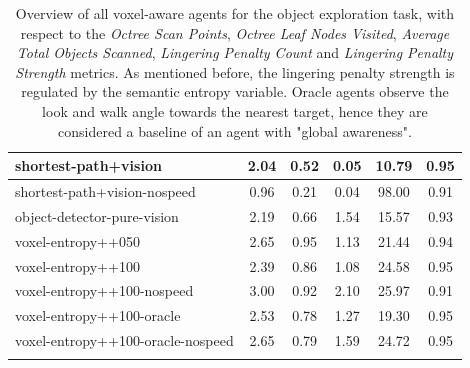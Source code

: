 \begin{table}
\begin{longtable}{|l|c|c|c|c|c|}
shortest-path+vision & {\cellcolor[HTML]{DCEBE8}} \color[HTML]{000000} 2.04 & {\cellcolor[HTML]{EBF2F0}} \color[HTML]{000000} 0.52 & {\cellcolor[HTML]{EBF2F0}} \color[HTML]{000000} 0.05 & 10.79 & 0.95 \\ \hline
shortest-path+vision-nospeed & {\cellcolor[HTML]{EBF2F0}} \color[HTML]{000000} 0.96 & {\cellcolor[HTML]{EBF2F0}} \color[HTML]{000000} 0.21 & {\cellcolor[HTML]{EBF2F0}} \color[HTML]{000000} 0.04 & 98.00 & 0.91 \\ \hline
object-detector-pure-vision & {\cellcolor[HTML]{DAEAE6}} \color[HTML]{000000} 2.19 & {\cellcolor[HTML]{EBF2F0}} \color[HTML]{000000} 0.66 & {\cellcolor[HTML]{A4D0C7}} \color[HTML]{000000} 1.54 & 15.57 & 0.93 \\ \hline
voxel-entropy++050 & {\cellcolor[HTML]{D4E7E3}} \color[HTML]{000000} 2.65 & {\cellcolor[HTML]{EBF2F0}} \color[HTML]{000000} 0.95 & {\cellcolor[HTML]{DEECE9}} \color[HTML]{000000} 1.13 & 21.44 & 0.94 \\ \hline
voxel-entropy++100 & {\cellcolor[HTML]{D7E9E5}} \color[HTML]{000000} 2.39 & {\cellcolor[HTML]{EBF2F0}} \color[HTML]{000000} 0.86 & {\cellcolor[HTML]{E5EFED}} \color[HTML]{000000} 1.08 & 24.58 & 0.95 \\ \hline
voxel-entropy++100-nospeed & {\cellcolor[HTML]{CEE4E0}} \color[HTML]{000000} 3.00 & {\cellcolor[HTML]{EBF2F0}} \color[HTML]{000000} 0.92 & {\cellcolor[HTML]{55AA99}} \color[HTML]{000000} 2.10 & 25.97 & 0.91 \\ \hline
voxel-entropy++100-oracle & {\cellcolor[HTML]{D5E8E4}} \color[HTML]{000000} 2.53 & {\cellcolor[HTML]{EBF2F0}} \color[HTML]{000000} 0.78 & {\cellcolor[HTML]{CBE3DD}} \color[HTML]{000000} 1.27 & 19.30 & 0.95 \\ \hline
voxel-entropy++100-oracle-nospeed & {\cellcolor[HTML]{D4E7E3}} \color[HTML]{000000} 2.65 & {\cellcolor[HTML]{EBF2F0}} \color[HTML]{000000} 0.79 & {\cellcolor[HTML]{9DCDC3}} \color[HTML]{000000} 1.59 & 24.72 & 0.95 \\ \hline
    
        \caption{
            Overview of all voxel-aware agents for the object exploration task, with respect to the \textit{Octree Scan Points}, \textit{Octree Leaf Nodes Visited}, \textit{Average Total Objects Scanned}, 
            \textit{Lingering Penalty Count} and \textit{Lingering Penalty Strength} metrics. As mentioned before, the lingering penalty strength is regulated by the semantic entropy variable. Oracle agents observe the look and walk angle towards the nearest target, hence they are considered a baseline of an agent with "global awareness".
        }
        \label{tab:results-RQ1-explorative-performance}
    \end{longtable}


\end{table}


